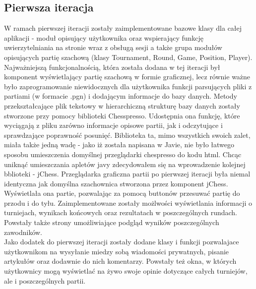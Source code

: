 \documentclass[12pt,leqno]{article}
\begin{document}
\subsection{Pierwsza iteracja}
W ramach pierwszej iteracji zostały zaimplementowane bazowe klasy dla całej aplikacji - moduł opisujący użytkownika oraz wspierający funkcję uwierzytelniania na stronie wraz z obsługą sesji a także grupa modułów opisujących partię szachową (klasy Tournament, Round, Game, Position, Player). Najważniejszą funkcjonalnością, która została dodana w tej iteracji był komponent wyświetlający partię szachową w formie graficznej, lecz równie ważne było zaprogramowanie niewidocznych dla użytkownika funkcji parsujących pliki z partiami (w formacie .pgn) i dodającym informacje do bazy danych. Metody przekształcające plik tekstowy w hierarchiczną strukturę bazy danych zostały stworzone przy pomocy biblioteki Chesspresso. Udostępnia ona funkcję, które wyciągają z pliku zarówno informacje opisowe partii, jak i odczytujące i sprawdzające poprawność posunięć. Biblioteka ta, mimo wszystkich swoich zalet, miała także jedną wadę - jako iż została napisana w Javie, nie było łatwego sposobu umieszczenia domyślnej przeglądarki chespresso do kodu html. Chcąc uniknąć umieszczania apletów javy zdecydowałem się na wprowadzenie kolejnej bblioteki - jChess. Przeglądarka graficzna partii po pierwszej iteracji była niemal identyczna jak domyślna szachownica stworzona przez komponent jChess. Wyświetlała ona partie, pozwalając za pomocą buttonów przesuwać partię do przodu i do tyłu. Zaimplementowane zostały możlwości wyświetlania informacji o turniejach, wynikach końcowych oraz rezultatach w poszczególnych rundach. Powstały także strony umożliwiające podgląd wyników poszczególnych zawodników.\\
Jako dodatek do pierwszej iteracji zostały dodane klasy i funkcji pozwalajace użytkownikom na wysyłanie miedzy sobą wiadomości prywatnych,  pisanie artykułów oraz dodawnie do nich komentarzy. Powstały też okna, w których użytkownicy mogą wyświetlać na żywo swoje opinie dotyczące całych turniejów, ale i poszczególnych partii.
\end{document}

